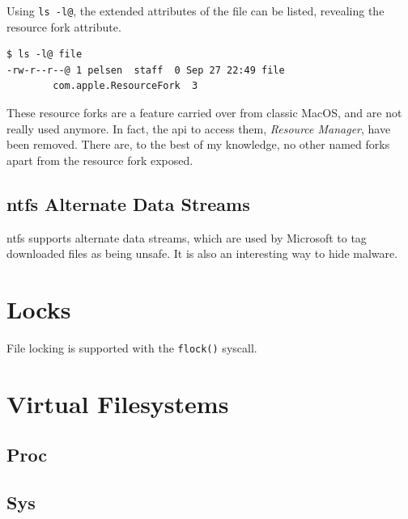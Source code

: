 \documentclass[a4paper]{article}
\begin{document}
Using \verb|ls -l@|, the extended attributes of the file can be listed, revealing the resource fork attribute.

\begin{verbatim}
$ ls -l@ file
-rw-r--r--@ 1 pelsen  staff  0 Sep 27 22:49 file
        com.apple.ResourceFork  3  
\end{verbatim}

These resource forks are a feature carried over from classic MacOS, and are not really used anymore. In fact, the \gls{api} to access them, \emph{Resource Manager}, have been removed. There are, to the best of my knowledge, no other named forks apart from the resource fork exposed.

\subsection{\gls{ntfs} Alternate Data Streams}


\gls{ntfs} supports alternate data streams, which are used by Microsoft to tag downloaded files as being unsafe. It is also an interesting way to hide malware.

\section{Locks}

File locking is supported with the \verb|flock()| syscall.


\section{Virtual Filesystems}


\subsection{Proc}


\subsection{Sys}

\end{document}
